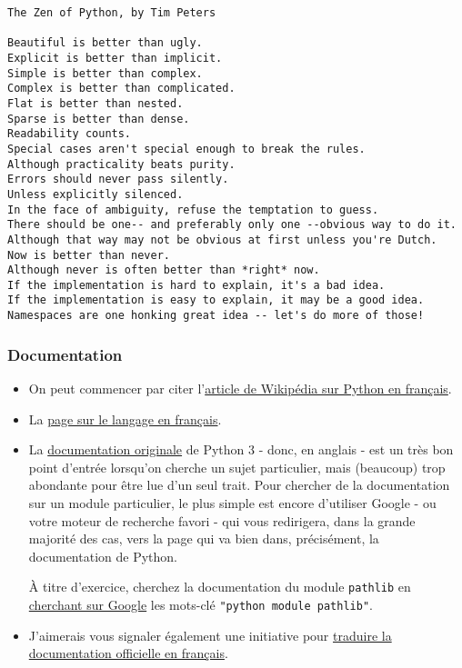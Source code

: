     \begin{Verbatim}[commandchars=\\\{\},frame=single,framerule=0.3mm,rulecolor=\color{cellframecolor}]
The Zen of Python, by Tim Peters

Beautiful is better than ugly.
Explicit is better than implicit.
Simple is better than complex.
Complex is better than complicated.
Flat is better than nested.
Sparse is better than dense.
Readability counts.
Special cases aren't special enough to break the rules.
Although practicality beats purity.
Errors should never pass silently.
Unless explicitly silenced.
In the face of ambiguity, refuse the temptation to guess.
There should be one-- and preferably only one --obvious way to do it.
Although that way may not be obvious at first unless you're Dutch.
Now is better than never.
Although never is often better than *right* now.
If the implementation is hard to explain, it's a bad idea.
If the implementation is easy to explain, it may be a good idea.
Namespaces are one honking great idea -- let's do more of those!
\end{Verbatim}

    \hypertarget{documentation}{%
\subsubsection{Documentation}\label{documentation}}

    \begin{itemize}
\item
  On peut commencer par citer
  l'\href{http://fr.wikipedia.org/wiki/Python_\%28langage\%29}{article
  de Wikipédia sur Python en français}.
\item
  La \href{https://wiki.python.org/moin/FrenchLanguage}{page sur le
  langage en français}.
\item
  La \href{https://docs.python.org/3/}{documentation originale} de
  Python 3 - donc, en anglais - est un très bon point d'entrée lorsqu'on
  cherche un sujet particulier, mais (beaucoup) trop abondante pour être
  lue d'un seul trait. Pour chercher de la documentation sur un module
  particulier, le plus simple est encore d'utiliser Google - ou votre
  moteur de recherche favori - qui vous redirigera, dans la grande
  majorité des cas, vers la page qui va bien dans, précisément, la
  documentation de Python.

  À titre d'exercice, cherchez la documentation du module
  \texttt{pathlib} en
  \href{https://www.google.fr/search?q=python+module+pathlib}{cherchant
  sur Google} les mots-clé \texttt{"python\ module\ pathlib"}.
\item
  J'aimerais vous signaler également une initiative pour
  \href{https://docs.python.org/fr/3/}{traduire la documentation
  officielle en français}.
\end{itemize}

